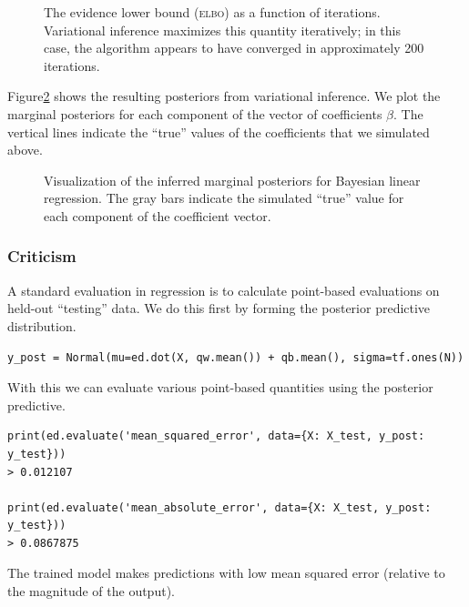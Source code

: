 \begin{figure}[htb]
\centering

\caption{The evidence lower bound (\textsc{elbo}) as a function of iterations.
Variational inference maximizes this quantity iteratively; in this case, the
algorithm appears to have converged in approximately 200 iterations.}
\label{fig:supervised-elbo}
\end{figure}

Figure\nobreakspace \ref{fig:supervised-betas} shows the resulting posteriors from  variational
inference. We plot the marginal posteriors for each component of the vector of
coefficients $\beta$. The vertical lines indicate the ``true'' values of the
coefficients that we simulated above.

\begin{figure}[htb]
\centering



\medskip




\medskip


\caption{Visualization of the inferred marginal posteriors for Bayesian linear
regression. The gray bars indicate the simulated ``true'' value for each
component of the coefficient vector.}
\label{fig:supervised-betas}
\end{figure}

\subsubsection{Criticism}

A standard evaluation in regression is to calculate point-based evaluations on
held-out ``testing'' data. We do this first by forming the posterior predictive
distribution.
\begin{lstlisting}
y_post = Normal(mu=ed.dot(X, qw.mean()) + qb.mean(), sigma=tf.ones(N))
\end{lstlisting}

With this we can evaluate various point-based quantities using the posterior
predictive.
\begin{lstlisting}
print(ed.evaluate('mean_squared_error', data={X: X_test, y_post: y_test}))
> 0.012107

print(ed.evaluate('mean_absolute_error', data={X: X_test, y_post: y_test}))
> 0.0867875
\end{lstlisting}

The trained model makes predictions with low mean squared error
(relative to the magnitude of the output).

